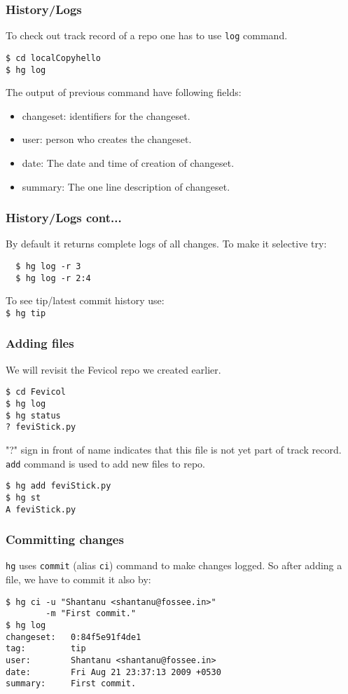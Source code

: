 \documentclass[14pt,compress]{beamer}
\newcounter{time}
\newcommand{\typ}[1]{\lstinline{#1}}
\begin{document}
\begin{frame}[fragile]
  \frametitle{History/Logs}
  To check out track record of a repo one has to use \typ{log} command.
  \begin{lstlisting}
$ cd localCopyhello
$ hg log    
  \end{lstlisting}
  The output of previous command have following fields:
  \begin{itemize}
  \item changeset: identifiers for the changeset.
  \item user: person who creates the changeset.
  \item date: The date and time of creation of changeset.
  \item summary: The one line description of changeset.
  \end{itemize}
\end{frame}

\begin{frame}[fragile]
  \frametitle{History/Logs cont...}
By default it returns complete logs of all changes. To make it selective try:
\begin{lstlisting}
  $ hg log -r 3
  $ hg log -r 2:4
\end{lstlisting}
To see tip/latest commit history use:\\
\typ{$ hg tip} %
\end{frame}

\begin{frame}[fragile]
  \frametitle{Adding files}
  We will revisit the Fevicol repo we created earlier.
  \begin{lstlisting}
$ cd Fevicol
$ hg log
$ hg status
? feviStick.py
  \end{lstlisting} %
  "?" sign in front of name indicates that this file is not yet part of track record. \typ{add} command is used to add new files to repo.
  \begin{lstlisting}
$ hg add feviStick.py
$ hg st
A feviStick.py
  \end{lstlisting}
\end{frame}

\begin{frame}[fragile]
  \frametitle{Committing changes}
  \typ{hg} uses \typ{commit} (alias \typ{ci}) command to make changes logged. So after adding a file, we have to commit it also by:
  \begin{lstlisting}
$ hg ci -u "Shantanu <shantanu@fossee.in>" 
        -m "First commit."
$ hg log
changeset:   0:84f5e91f4de1
tag:         tip
user:        Shantanu <shantanu@fossee.in>
date:        Fri Aug 21 23:37:13 2009 +0530
summary:     First commit.    
  \end{lstlisting}
\end{frame}
\end{document}
